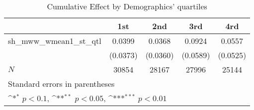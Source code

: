 \begin{table}[htbp]\centering
\def\sym#1{\ifmmode^{#1}\else\(^{#1}\)\fi}
\caption{Cumulative Effect by Demographics' quartiles}
\begin{tabular}{l*{4}{c}}
\hline\hline
            &\multicolumn{1}{c}{1st}&\multicolumn{1}{c}{2nd}&\multicolumn{1}{c}{3rd}&\multicolumn{1}{c}{4rd}\\
\hline
sh\_mww\_wmean1\_st\_qtl&      0.0399         &      0.0368         &      0.0924         &      0.0557         \\
            &    (0.0373)         &    (0.0360)         &    (0.0589)         &    (0.0525)         \\
\hline
\(N\)       &       30854         &       28167         &       27996         &       25144         \\
\hline\hline
\multicolumn{5}{l}{\footnotesize Standard errors in parentheses}\\
\multicolumn{5}{l}{\footnotesize \sym{*} \(p<0.1\), \sym{**} \(p<0.05\), \sym{***} \(p<0.01\)}\\
\end{tabular}
\end{table}
